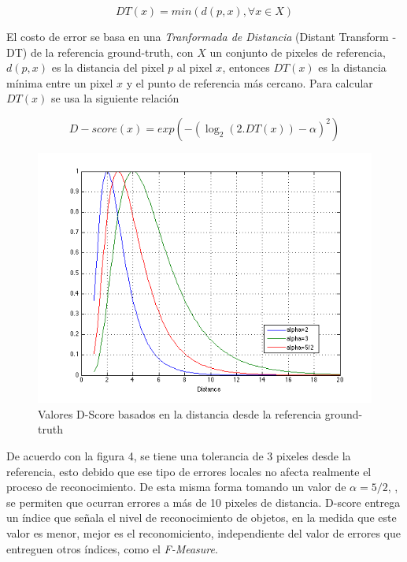 \begin{equation}
DT(x) = min( d(p,x), \forall x \in X)
\end{equation}

El costo de error se basa en una \emph{Tranformada de Distancia} (Distant Transform - DT) de la referencia ground-truth, con $X$ un conjunto de pixeles de referencia, $d(p,x)$ es la distancia del pixel $p$ al pixel $x$, entonces $DT(x)$ es la distancia mínima entre un pixel $x$ y el punto de referencia más cercano. Para calcular $DT(x)$ se usa la siguiente relación

\begin{equation}
D-score(x) = exp( - (\log_2(2.DT(x)) - \alpha )^2)
\end{equation}


\begin{figure}[!ht]
\centering
\includegraphics[scale=0.4]{img/dscore}
\caption{Valores D-Score basados en la distancia desde la referencia ground-truth}
\label{fig:Valores D-Score}
\end{figure}

De acuerdo con la figura 4, se tiene una tolerancia de 3 pixeles desde la referencia, esto debido que ese tipo de errores locales no afecta realmente el proceso de reconocimiento. De esta misma forma tomando un valor de $\alpha=5/2$, \cite{park_benchmark_2013}, se permiten que ocurran errores a más de 10 pixeles de distancia. D-score entrega un índice que señala el nivel de reconocimiento de objetos, en la medida que este valor es menor, mejor es el reconomiciento, independiente del valor de errores que entreguen otros índices, como el \emph{F-Measure}.

